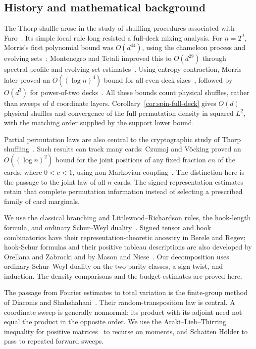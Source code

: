 \subsection*{History and mathematical background}
The Thorp shuffle arose in the study of shuffling procedures associated
with Faro~\cite{Thorp1973}. Its simple local rule long resisted a
full-deck mixing analysis. For $n=2^d$, Morris's first polynomial
bound was $O(d^{44})$, using the chameleon process and evolving
sets~\cite{Morris2008}; Montenegro and Tetali improved this to
$O(d^{29})$ through spectral-profile and evolving-set
estimates~\cite[Section~6.4]{MontenegroTetali2006}.
Using entropy contraction, Morris later proved an $O((\log n)^4)$ bound for all even deck
sizes~\cite{Morris2009}, followed by $O(d^3)$ for power-of-two
decks~\cite{Morris2013}. All these bounds count physical shuffles,
rather than sweeps of $d$ coordinate layers. Corollary~\ref{cor:spin-full-deck}
gives $O(d)$ physical shuffles and convergence of the full permutation
density in squared $L^2$, with the matching order supplied by the
support lower bound.

Partial permutation laws are also central to the cryptographic study
of Thorp shuffling~\cite{mrs,MorrisRogawayStegers2018}. Such results
can track many cards: Czumaj and V\"ocking proved an
$O((\log n)^2)$ bound for the joint positions of any fixed fraction
$cn$ of the cards, where $0<c<1$, using non-Markovian
coupling~\cite{CzumajVocking2014}. The distinction here is the passage
to the joint law of all $n$ cards. The signed representation estimates
retain that complete permutation information instead of selecting a
prescribed family of card marginals.

We use the classical branching and Littlewood--Richardson rules, the
hook-length formula, and ordinary Schur--Weyl
duality~\cite{James1978,Sagan2001,Stanley1999,etingof,VershikOkounkov2005}.
Signed tensor and hook combinatorics have their representation-theoretic
ancestry in Berele and Regev; hook-Schur formulas and their positive
tableau descriptions are also developed by Orellana and Zabrocki and
by Mason and Niese~\cite{BereleRegev1987,orellana-zabrocki2000,mason-niese2016}.
Our decomposition uses ordinary Schur--Weyl duality on the two parity
classes, a sign twist, and induction. The density comparisons and the
budget estimates are proved here.

The passage from Fourier estimates to total variation is the
finite-group method of Diaconis and
Shahshahani~\cite{DiaconisShahshahani1981}. Their random-transposition
law is central. A coordinate sweep is generally nonnormal: its product
with its adjoint need not equal the product in the opposite order.
We use the Araki--Lieb--Thirring inequality for positive
matrices~\cite{araki1990,audenaert2007} to recurse on moments, and
Schatten H\"older to pass to repeated forward sweeps.

